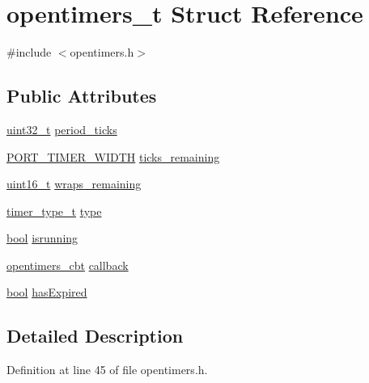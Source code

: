 \hypertarget{structopentimers__t}{}\section{opentimers\+\_\+t Struct Reference}
\label{structopentimers__t}


{\ttfamily \#include $<$opentimers.\+h$>$}

\subsection*{Public Attributes}
\begin{DoxyCompactItemize}
\item 
\hyperlink{_p_e___types_8h_a33594304e786b158f3fb30289278f5af}{uint32\+\_\+t} \hyperlink{structopentimers__t_a4cbd7facfbcf83c01a275c8a2e02a448}{period\+\_\+ticks}
\item 
\hyperlink{z1_2board__info_8h_abe66b9c1c60db84f2a99f2b827275f24}{P\+O\+R\+T\+\_\+\+T\+I\+M\+E\+R\+\_\+\+W\+I\+D\+TH} \hyperlink{structopentimers__t_a9033b4c54424e36c49fcc49a9a6e3380}{ticks\+\_\+remaining}
\item 
\hyperlink{_p_e___types_8h_a1f1825b69244eb3ad2c7165ddc99c956}{uint16\+\_\+t} \hyperlink{structopentimers__t_ad06c9dbce2b6e20eecdd1e47e68547f1}{wraps\+\_\+remaining}
\item 
\hyperlink{group___open_timers_ga66e6b1d10289945ae9284d769f136e59}{timer\+\_\+type\+\_\+t} \hyperlink{structopentimers__t_afe86687f7300b5ffc9a2249ffd6f3292}{type}
\item 
\hyperlink{_p_e___types_8h_a97a80ca1602ebf2303258971a2c938e2}{bool} \hyperlink{structopentimers__t_acce4c8365075ca1d6cda0b5d1fe27fb9}{isrunning}
\item 
\hyperlink{group___open_timers_ga93a6f1f7e03cd8ad88cbd9509db173cf}{opentimers\+\_\+cbt} \hyperlink{structopentimers__t_a6059fd28c54d32158e3946b0259aeb34}{callback}
\item 
\hyperlink{_p_e___types_8h_a97a80ca1602ebf2303258971a2c938e2}{bool} \hyperlink{structopentimers__t_a6f3c8db5b71757ee3d2f5b59b00e2dca}{has\+Expired}
\end{DoxyCompactItemize}


\subsection{Detailed Description}


Definition at line 45 of file opentimers.\+h.



